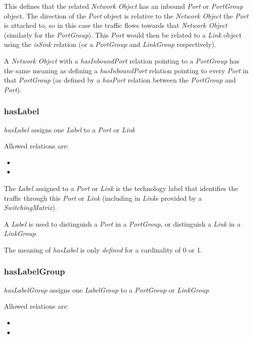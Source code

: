 This defines that the related \emph{Network Object} has an inbound \emph{Port} or \emph{PortGroup} object. The direction of the \emph{Port} object is relative to the \emph{Network Object} the \emph{Port} is attached to, so in this case the traffic flows towards that \emph{Network Object} (similarly for the \emph{PortGroup}). This \emph{Port} would then be related to a \emph{Link} object using the \emph{isSink} relation (or a \emph{PortGroup} and \emph{LinkGroup} respectively).

A \emph{Network Object} with a \emph{hasInboundPort} relation pointing to a \emph{PortGroup} has the same meaning as defining a \emph{hasInboundPort} relation pointing to every \emph{Port} in that \emph{PortGroup} (as defined by a \emph{hasPort} relation between the \emph{PortGroup} and \emph{Port}).


\subsubsection{hasLabel}%
\label{rel:hasLabel}

\emph{hasLabel} assigns one \emph{Label} to a \emph{Port} or \emph{Link}

Allowed relations are:
\begin{itemize}
    \item {}
    \item {}
\end{itemize}

The \emph{Label} assigned to a \emph{Port} or \emph{Link} is the technology label that identifies the traffic through this \emph{Port} or \emph{Link} (including in \emph{Link}s provided by a \emph{SwitchingMatrix}).

A \emph{Label} is used to distinguish a \emph{Port} in a \emph{PortGroup}, or distinguish a \emph{Link} in a \emph{LinkGroup}.

The meaning of \emph{hasLabel} is only \emph{defined} for a cardinality of 0 or 1.


\subsubsection{hasLabelGroup}%
\label{rel:hasLabelGroup}

\emph{hasLabelGroup} assigns one \emph{LabelGroup} to a \emph{PortGroup} or \emph{LinkGroup}

Allowed relations are:
\begin{itemize}
    \item {}
    \item {}
\end{itemize}

